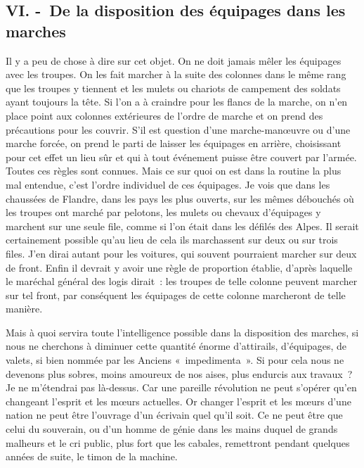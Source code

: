 \documentclass[french,twoside]{book} %
\begin{document}
\subsection[{VI. - De la disposition des équipages dans les marches}]{VI. - De la disposition des équipages dans les marches}
\noindent Il y a peu de chose à dire sur cet objet. On ne doit jamais mêler les équipages avec les troupes. On les fait marcher à la suite des colonnes dans le même rang que les troupes y tiennent et les mulets ou chariots de campement des soldats ayant toujours la tête. Si l’on a à craindre pour les flancs de la marche, on n’en place point aux colonnes extérieures de l’ordre de marche et on prend des précautions pour les couvrir. S’il est question d’une marche-manœuvre ou d’une marche forcée, on prend le parti de laisser les équipages en arrière, choisissant pour cet effet un lieu sûr et qui à tout événement puisse être couvert par l’armée. Toutes ces règles sont connues. Mais ce sur quoi on est dans la routine la plus mal entendue, c’est l’ordre individuel de ces équipages. Je vois que dans les chaussées de Flandre, dans les pays les plus ouverts, sur les mêmes débouchés où les troupes ont marché par pelotons, les mulets ou chevaux d’équipages y marchent sur une seule file, comme si l’on était dans les défilés des Alpes. Il serait certainement possible qu’au lieu de cela ils marchassent sur deux ou sur trois files. J’en dirai autant pour les voitures, qui souvent pourraient marcher sur deux de front. Enfin il devrait y avoir une règle de proportion établie, d’après laquelle le maréchal général des logis dirait : les troupes de telle colonne peuvent marcher sur tel front, par conséquent les équipages de cette colonne marcheront de telle manière.\par
Mais à quoi servira toute l’intelligence possible dans la disposition des marches, si nous ne cherchons à diminuer cette quantité énorme d’attirails, d’équipages, de valets, si bien nommée par les Anciens « impedimenta ». Si pour cela nous ne devenons plus sobres, moins amoureux de nos aises, plus endurcis aux travaux ? Je ne m’étendrai pas là-dessus. Car une pareille révolution ne peut s’opérer qu’en changeant l’esprit et les mœurs actuelles. Or changer l’esprit et les mœurs d’une nation ne peut être l’ouvrage d’un écrivain quel qu’il soit. Ce ne peut être que celui du souverain, ou d’un homme de génie dans les mains duquel de grands malheurs et le cri public, plus fort que les cabales, remettront pendant quelques années de suite, le timon de la machine.
\end{document}
